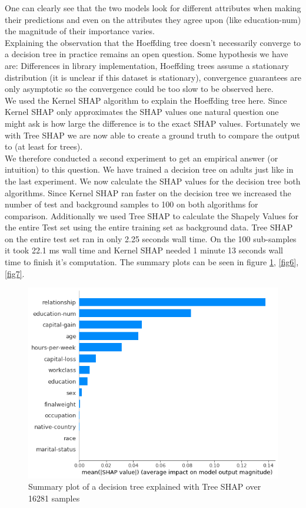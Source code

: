\documentclass[conference]{IEEEtran}
\begin{document}
One can clearly see that the two models look for different attributes when making their predictions and even on the attributes they agree upon (like education-num) the magnitude of their importance varies.\\
Explaining the observation that the Hoeffding tree doesn't necessarily converge to a decision tree in practice remains an open question.
Some hypothesis we have are: Differences in library implementation, Hoeffding trees assume a stationary distribution (it is unclear if this dataset is stationary), convergence guarantees are only asymptotic so the convergence could be too slow to be observed here.\\

We used the Kernel SHAP algorithm to explain the Hoeffding tree here. Since Kernel SHAP only approximates the SHAP values one natural question one might ask is how large the difference is to the exact SHAP values.
Fortunately we with Tree SHAP we are now able to create a ground truth to compare the output to (at least for trees).\\
We therefore conducted a second experiment to get an empirical answer (or intuition) to this question.
We have trained a decision tree on adults just like in the last experiment. 
We now calculate the SHAP values for the decision tree both algorithms. 
Since Kernel SHAP ran faster on the decision tree we increased the number of test and background samples to 100 on both algorithms for comparison.
Additionally we used Tree SHAP to calculate the Shapely Values for the entire Test set using the entire training set as background data.
Tree SHAP on the entire test set ran in only 2.25 seconds wall time. On the 100 sub-samples it took 22.1 ms wall time and Kernel SHAP needed 1 minute 13 seconds wall time to finish it's computation.
The summary plots can be seen in figure \ref{fig5}, \ref{fig6}, \ref{fig7}.

\begin{figure}[htbp]
\centerline{
	\includegraphics[width=\linewidth]{../fig/ex_02_TreeShap_16281_Samples_SummaryPlot.png}
}
\caption{Summary plot of a decision tree explained with Tree SHAP over 16281 samples}
\label{fig5}
\end{figure}
\end{document}
